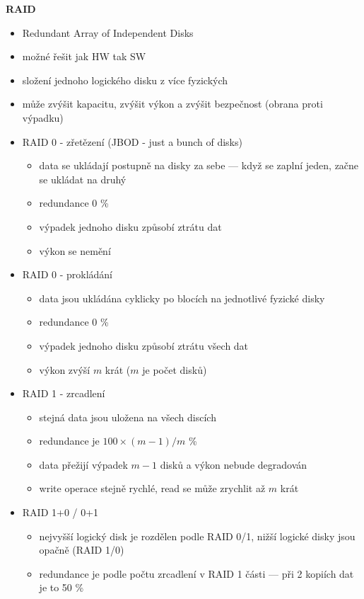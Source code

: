 \textbf{RAID}
\begin{itemize}
    \item Redundant Array of Independent Disks
    \item možné řešit jak HW tak SW
    \item složení jednoho logického disku z více fyzických
    \item může zvýšit kapacitu, zvýšit výkon a zvýšit bezpečnost (obrana proti výpadku)
    \item RAID 0 - zřetězení (JBOD - just a bunch of disks)
    \begin{itemize}
        \item data se ukládají postupně na disky za sebe --- když se zaplní jeden, začne se ukládat na druhý
        \item redundance 0 \%
        \item výpadek jednoho disku způsobí ztrátu dat
        \item výkon se nemění
    \end{itemize}
    \item RAID 0 - prokládání
    \begin{itemize}
        \item data jsou ukládána cyklicky po blocích na jednotlivé fyzické disky
        \item redundance 0 \%
        \item výpadek jednoho disku způsobí ztrátu všech dat
        \item výkon zvýší $m$ krát ($m$ je počet disků)
    \end{itemize}
    \item RAID 1 - zrcadlení
    \begin{itemize}
        \item stejná data jsou uložena na všech discích
        \item redundance je $100\times (m-1)/m$ \%
        \item data přežijí výpadek $m-1$ disků a výkon nebude degradován
        \item write operace stejně rychlé, read se může zrychlit až $m$ krát
    \end{itemize}
    \item RAID 1+0 / 0+1
    \begin{itemize}
        \item nejvyšší logický disk je rozdělen podle RAID 0/1, nižší logické disky jsou opačně (RAID 1/0)
        \item redundance je podle počtu zrcadlení v RAID 1 části --- při 2 kopiích dat je to 50 \%

\end{itemize}
\end{itemize}
